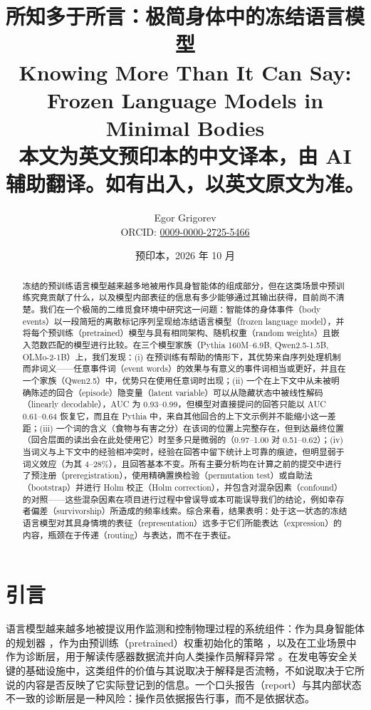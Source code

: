 \documentclass[UTF8,fontset=none,a4paper]{ctexart}
\title{所知多于所言：极简身体中的冻结语言模型\\[0.5em]\large Knowing More Than It Can Say: Frozen Language Models in Minimal Bodies\\[0.8em]\normalsize 本文为英文预印本的中文译本，由 AI 辅助翻译。如有出入，以英文原文为准。}
\author{Egor Grigorev\\ ORCID: \href{https://orcid.org/0009-0000-2725-5466}{0009-0000-2725-5466}}
\date{预印本，2026 年 10 月}
\begin{document}
\maketitle
\begin{abstract}
冻结的预训练语言模型越来越多地被用作具身智能体的组成部分，但在这类场景中预训练究竟贡献了什么，以及模型内部表征的信息有多少能够通过其输出获得，目前尚不清楚。我们在一个极简的二维觅食环境中研究这一问题：智能体的身体事件（body events）以一段简短的离散标记序列呈现给冻结语言模型（frozen language model），并将每个预训练（pretrained）模型与具有相同架构、随机权重（random weights）且嵌入范数匹配的模型进行比较。在三个模型家族（Pythia \mbox{160M--6.9B}, \mbox{Qwen2.5-1.5B}, \mbox{OLMo-2-1B}）上，我们发现：(i) 在预训练有帮助的情形下，其优势来自序列处理机制而非词义------任意事件词（event words）的效果与有意义的事件词相当或更好，并且在一个家族（Qwen2.5）中，优势只在使用任意词时出现；(ii) 一个在上下文中从未被明确陈述的回合（episode）隐变量（latent variable）可以从隐藏状态中被线性解码（linearly decodable），AUC 为 \mbox{0.93--0.99}，但模型对直接提问的回答只能以 AUC \mbox{0.61--0.64} 恢复它，而且在 Pythia 中，来自其他回合的上下文示例并不能缩小这一差距；(iii) 一个词的含义（食物与有害之分）在该词的位置上完整存在，但到达最终位置（回合层面的读出会在此处使用它）时至多只是微弱的（\mbox{0.97--1.00} 对 \mbox{0.51--0.62}）；(iv) 当词义与上下文中的经验相冲突时，经验在回答中留下统计上可靠的痕迹，但明显弱于词义效应（为其 \mbox{4--28}\%），且回答基本不变。所有主要分析均在计算之前的提交中进行了预注册（preregistration），使用精确置换检验（permutation test）或自助法（bootstrap）并进行 Holm 校正（Holm correction），并包含对混杂因素（confound）的对照------这些混杂因素在项目进行过程中曾误导或本可能误导我们的结论，例如幸存者偏差（survivorship）所造成的频率线索。综合来看，结果表明：处于这一状态的冻结语言模型对其具身情境的表征（representation）远多于它们所能表达（expression）的内容，瓶颈在于传递（routing）与表达，而不在于表征。
\end{abstract}

\section{引言}

语言模型越来越多地被提议用作监测和控制物理过程的系统组件：作为具身智能体的规划器 \citep{ahn2022,huang2022}，作为由预训练（pretrained）权重初始化的策略 \citep{li2022,reid2022}，以及在工业场景中作为诊断层，用于解读传感器数据流并向人类操作员解释异常 \citep{dave2024,li2026,liu2025}。在发电等安全关键的基础设施中，这类组件的价值与其说取决于解释是否流畅，不如说取决于它所说的内容是否反映了它实际登记到的信息。一个口头报告（report）与其内部状态不一致的诊断层是一种风险：操作员依据报告行事，而不是依据状态。
\end{document}
